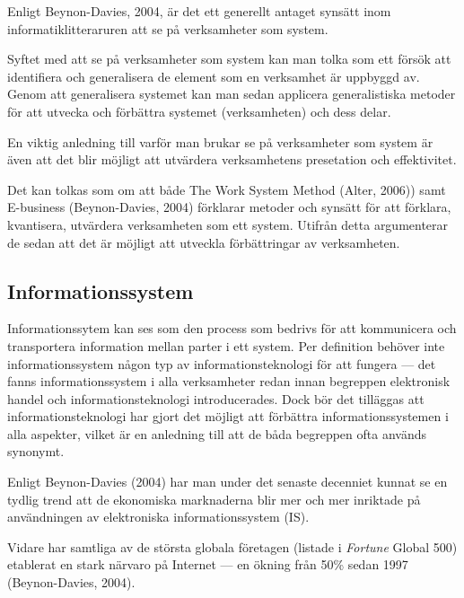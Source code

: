 \documentclass[12pt,a4paper,titlepage]{article}
\begin{document}
Enligt Beynon-Davies, 2004, är det ett generellt antaget synsätt inom informatiklitteraruren att se på verksamheter som system.

Syftet med att se på verksamheter som system kan man tolka som ett försök att identifiera och generalisera de element som en verksamhet är uppbyggd av. Genom att generalisera systemet kan man sedan applicera generalistiska metoder för att utvecka och förbättra systemet (verksamheten) och dess delar.

En viktig anledning till varför man brukar se på verksamheter som system är även att det blir möjligt att utvärdera verksamhetens presetation och effektivitet.

Det kan tolkas som om att både The Work System Method (Alter, 2006)) samt E-business (Beynon-Davies, 2004) förklarar metoder och synsätt för att förklara, kvantisera, utvärdera verksamheten som ett system. Utifrån  detta argumenterar de sedan att det är möjligt att utveckla förbättringar av verksamheten.

\subsection{\textsf{Informationssystem}}
Informationssytem kan ses som den process som bedrivs för att kommunicera och transportera information mellan parter i ett system. Per definition behöver inte informationssystem någon typ av informationsteknologi för att fungera --- det fanns informationssystem i alla verksamheter redan innan begreppen elektronisk handel och informationsteknologi introducerades. Dock bör det tilläggas att informationsteknologi har gjort det möjligt att förbättra informationssystemen i alla aspekter, vilket är en anledning till att de båda begreppen ofta används synonymt.


Enligt Beynon-Davies (2004) har man under det senaste decenniet kunnat se en tydlig trend att de ekonomiska marknaderna blir mer och mer inriktade på användningen av elektroniska informationssystem (IS).

Vidare har samtliga av de största globala företagen (listade i \textit{Fortune} Global 500) etablerat en stark närvaro på Internet --- en ökning från 50\% sedan 1997 (Beynon-Davies, 2004).
\end{document}
